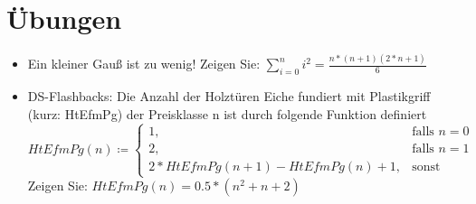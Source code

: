 \documentclass[hidelinks]{article}
\theoremstyle{plain}
\theoremstyle{definition}
\theoremstyle{rem}
\begin{document}
\begin{sloppypar}
\section{Übungen}
\begin{itemize}
\item Ein kleiner Gauß ist zu wenig! Zeigen Sie: $\sum_{i=0}^{n}i^2=\frac{n*(n+1)(2*n+1)}{6}$
\item DS-Flashbacks: Die Anzahl der Holztüren Eiche fundiert mit Plastikgriff (kurz: HtEfmPg) der Preisklasse n ist durch folgende Funktion definiert
\begin{equation}
HtEfmPg(n)\coloneqq\begin{cases}
		1, & \text{falls $n=0$}\\
		2, & \text{falls $n=1$}\\
	   	2*HtEfmPg(n+1)-HtEfmPg(n)+1, & \text{sonst}
	\end{cases}
\end{equation}
Zeigen Sie: $HtEfmPg(n)=0.5*(n^2+n+2)$
\end{itemize}
\end{sloppypar}
\end{document}
